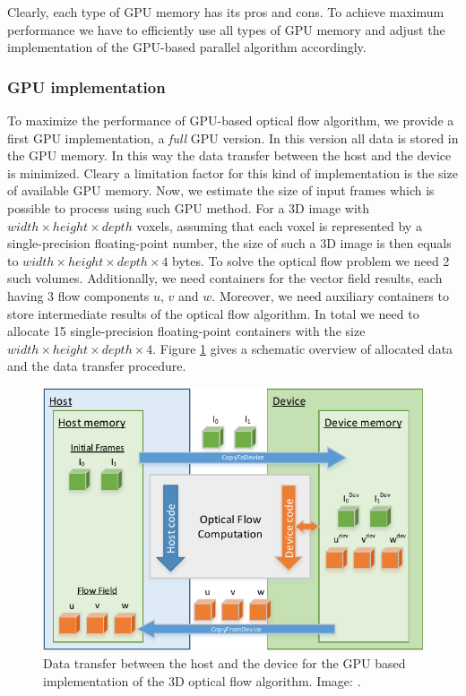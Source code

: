 Clearly, each type of GPU memory has its pros and cons. To achieve maximum performance we have to efficiently use all types of GPU memory and adjust the implementation of the GPU-based parallel algorithm accordingly.

\subsubsection{GPU implementation}


To maximize the performance of GPU-based optical flow algorithm, we provide a first GPU implementation, a \textit{full} GPU version. In this version all data is stored in the GPU memory. In this way the data transfer between the host and the device is minimized. Cleary a limitation factor for this kind of implementation is the size of available GPU memory. Now, we estimate the size of input frames which is possible to process using such GPU method. For a 3D image with $width \times height \times depth$ voxels, assuming that each voxel is represented by a single-precision floating-point number, the size of such a 3D image is then equals to $width \times height \times depth \times 4$ bytes. To solve the optical flow problem we need 2 such volumes. Additionally, we need containers for the vector field results, each having 3 flow components $u$, $v$ and $w$. Moreover, we need  auxiliary containers to store intermediate results of the optical flow algorithm. In total we need to allocate 15 single-precision floating-point containers with the size $width \times height \times depth \times 4$. Figure \ref{fig:data-copy} gives a schematic overview of allocated data and the data transfer procedure.  

\begin{figure}[h]
	\centering
	\includegraphics[width=.65\textwidth]{figures/data-copy.pdf}
	\caption{Data transfer between the host and the device for the GPU based implementation of the 3D optical flow algorithm. Image: \cite{KarlinskiyThesis}.}
	\label{fig:data-copy}
\end{figure}

